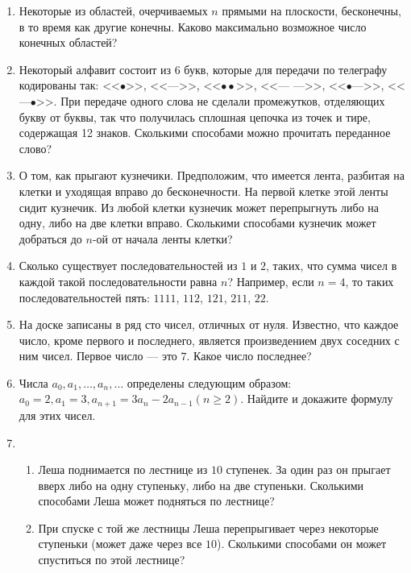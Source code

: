 \begin{enumerate}
\item Некоторые из областей, очерчиваемых $n$ прямыми на плоскости, бесконечны,
в то время как другие конечны. Каково максимально возможное число конечных областей?

\item Некоторый алфавит состоит из 6 букв, которые для передачи по телеграфу кодированы так:
<<$\bullet$>>, <<--->>, <<$\bullet\bullet$>>, <<--- --->>, <<$\bullet$--->>, <<---$\bullet$>>. При передаче одного слова не сделали промежутков, отделяющих букву от буквы, так что получилась сплошная цепочка из точек и тире, содержащая 12 знаков. Сколькими способами можно прочитать переданное слово? 

\item О том, как прыгают кузнечики. Предположим, что имеется лента, разбитая на клетки и уходящая вправо до бесконечности. На первой клетке этой ленты сидит кузнечик. Из любой клетки кузнечик может перепрыгнуть либо на одну, либо на две клетки вправо. Сколькими способами кузнечик может добраться до $n$-ой от начала ленты клетки? 

\item Сколько существует последовательностей из $1$ и $2$, таких, что сумма чисел в каждой такой последовательности равна $n$? Например, если $n = 4$, то таких последовательностей пять:
$1111$, $112$, $121$, $211$, $22$.

\item На доске записаны в ряд сто чисел, отличных от нуля. Известно, что каждое число, кроме первого и последнего, является произведением двух соседних с ним чисел. Первое число –-- это $7$. Какое число последнее?

\item Числа $a_0, a_1, \ldots , a_n, \ldots$ определены следующим образом:
$a_0 = 2, a_1 = 3,  a_{n + 1} = 3a_n - 2a_{n - 1} (n \ge 2)$.
Найдите и докажите формулу для этих чисел. 

\item \begin{enumerate}
    \item Леша поднимается по лестнице из $10$ ступенек. За один раз он прыгает вверх либо на одну  
          ступеньку, либо на две ступеньки. Сколькими способами Леша может подняться по лестнице? 
    \item При спуске с той же лестницы Леша перепрыгивает через некоторые ступеньки (может даже 
          через все $10$). Сколькими способами он может спуститься по этой лестнице?
\end{enumerate}


\end{enumerate}
